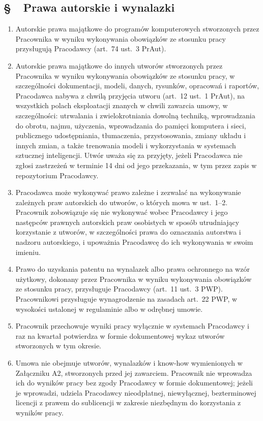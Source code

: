 \documentclass[11pt,a4paper]{report}
\newcounter{paragraf}
\newcommand{\paragraf}[1]{%
  \refstepcounter{paragraf}%
  \Needspace{5\baselineskip}%
  \subsection*{\S~\theparagraf\ #1}%
}
\newenvironment{ContractClause}[1]{\paragraf{#1}}{\par}
\begin{document}
\begin{ContractClause}{Prawa autorskie i wynalazki}
\label{a:ip}
\begin{enumerate}
  \item Autorskie prawa majątkowe do programów komputerowych stworzonych przez Pracownika w wyniku wykonywania obowiązków ze stosunku pracy przysługują Pracodawcy (art.~74 ust.~3 PrAut).
  \item Autorskie prawa majątkowe do innych utworów stworzonych przez Pracownika w wyniku wykonywania obowiązków ze stosunku pracy, w szczególności dokumentacji, modeli, danych, rysunków, opracowań i raportów, Pracodawca nabywa z chwilą przyjęcia utworu (art.~12 ust.~1 PrAut), na wszystkich polach eksploatacji znanych w chwili zawarcia umowy, w szczególności: utrwalania i zwielokrotniania dowolną techniką, wprowadzania do obrotu, najmu, użyczenia, wprowadzania do pamięci komputera i sieci, publicznego udostępniania, tłumaczenia, przystosowania, zmiany układu i innych zmian, a także trenowania modeli i wykorzystania w systemach sztucznej inteligencji. Utwór uważa się za przyjęty, jeżeli Pracodawca nie zgłosi zastrzeżeń w terminie 14 dni od jego przekazania, w tym przez zapis w repozytorium Pracodawcy.
  \item Pracodawca może wykonywać prawo zależne i zezwalać na wykonywanie zależnych praw autorskich do utworów, o których mowa w ust.~1--2. Pracownik zobowiązuje się nie wykonywać wobec Pracodawcy i jego następców prawnych autorskich praw osobistych w sposób utrudniający korzystanie z utworów, w szczególności prawa do oznaczania autorstwa i nadzoru autorskiego, i upoważnia Pracodawcę do ich wykonywania w swoim imieniu.
  \item Prawo do uzyskania patentu na wynalazek albo prawa ochronnego na wzór użytkowy, dokonany przez Pracownika w wyniku wykonywania obowiązków ze stosunku pracy, przysługuje Pracodawcy (art.~11 ust.~3 PWP). Pracownikowi przysługuje wynagrodzenie na zasadach art.~22 PWP, w wysokości ustalonej w regulaminie albo w odrębnej umowie.
  \item Pracownik przechowuje wyniki pracy wyłącznie w systemach Pracodawcy i raz na kwartał potwierdza w formie dokumentowej wykaz utworów stworzonych w tym okresie.
  \item Umowa nie obejmuje utworów, wynalazków i know-how wymienionych w Załączniku A2, stworzonych przed jej zawarciem. Pracownik nie wprowadza ich do wyników pracy bez zgody Pracodawcy w formie dokumentowej; jeżeli je wprowadzi, udziela Pracodawcy nieodpłatnej, niewyłącznej, bezterminowej licencji z prawem do sublicencji w zakresie niezbędnym do korzystania z wyników pracy.
\end{enumerate}
\end{ContractClause}
\end{document}
